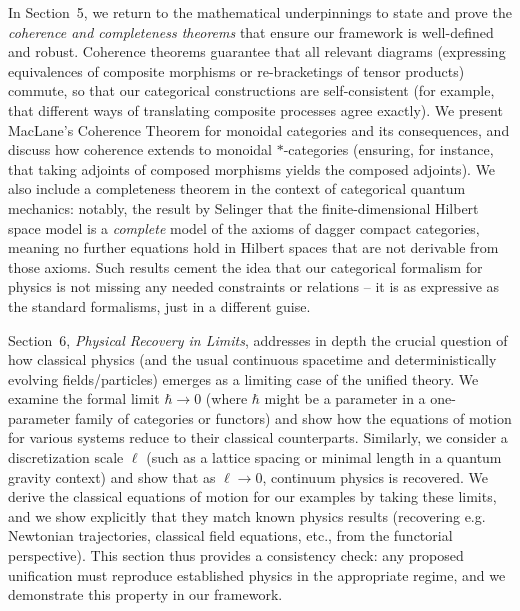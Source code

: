 \vspace{0.5cm}

In Section~5, we return to the mathematical underpinnings to state and prove the \emph{coherence and completeness theorems} that ensure our framework is well-defined and robust. Coherence theorems guarantee that all relevant diagrams (expressing equivalences of composite morphisms or re-bracketings of tensor products) commute, so that our categorical constructions are self-consistent (for example, that different ways of translating composite processes agree exactly). We present MacLane's Coherence Theorem for monoidal categories and its consequences, and discuss how coherence extends to monoidal $*$-categories (ensuring, for instance, that taking adjoints of composed morphisms yields the composed adjoints). We also include a completeness theorem in the context of categorical quantum mechanics: notably, the result by Selinger that the finite-dimensional Hilbert space model is a \emph{complete} model of the axioms of dagger compact categories, meaning no further equations hold in Hilbert spaces that are not derivable from those axioms. Such results cement the idea that our categorical formalism for physics is not missing any needed constraints or relations -- it is as expressive as the standard formalisms, just in a different guise.

\vspace{0.5cm}

Section~6, \emph{Physical Recovery in Limits}, addresses in depth the crucial question of how classical physics (and the usual continuous spacetime and deterministically evolving fields/particles) emerges as a limiting case of the unified theory. We examine the formal limit $\hbar \to 0$ (where $\hbar$ might be a parameter in a one-parameter family of categories or functors) and show how the equations of motion for various systems reduce to their classical counterparts. Similarly, we consider a discretization scale $\ell$ (such as a lattice spacing or minimal length in a quantum gravity context) and show that as $\ell \to 0$, continuum physics is recovered. We derive the classical equations of motion for our examples by taking these limits, and we show explicitly that they match known physics results (recovering e.g. Newtonian trajectories, classical field equations, etc., from the functorial perspective). This section thus provides a consistency check: any proposed unification must reproduce established physics in the appropriate regime, and we demonstrate this property in our framework.

